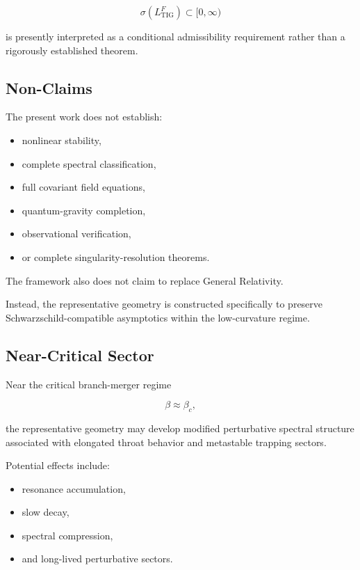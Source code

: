 \begin{equation}
\sigma(L_{\mathrm{TIG}}^{F})
\subset
[0,\infty)
\end{equation}

is presently interpreted as a conditional admissibility requirement rather than a rigorously established theorem.


\subsection{Non-Claims}

The present work does not establish:
\begin{itemize}[leftmargin=0.6cm]
\item nonlinear stability,
\item complete spectral classification,
\item full covariant field equations,
\item quantum-gravity completion,
\item observational verification,
\item or complete singularity-resolution theorems.
\end{itemize}

The framework also does not claim to replace General Relativity.

Instead, the representative geometry is constructed specifically to preserve Schwarzschild-compatible asymptotics within the low-curvature regime.


\subsection{Near-Critical Sector}

Near the critical branch-merger regime

\begin{equation}
\beta \approx \beta_c,
\end{equation}

the representative geometry may develop modified perturbative spectral structure associated with elongated throat behavior and metastable trapping sectors.

Potential effects include:
\begin{itemize}[leftmargin=0.6cm]
\item resonance accumulation,
\item slow decay,
\item spectral compression,
\item and long-lived perturbative sectors.
\end{itemize}

